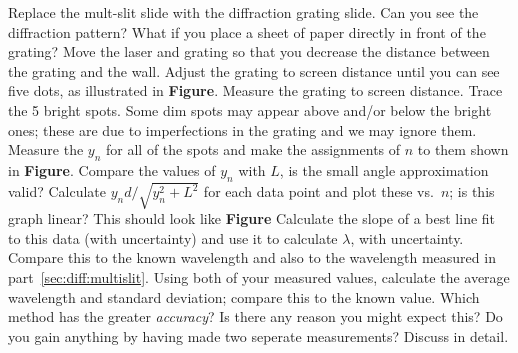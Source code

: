 Replace the mult-slit slide with the diffraction grating slide.  Can you see
the diffraction pattern?  What if you place a sheet of paper directly in front
of the grating?  Move the laser and grating so that you decrease the distance
between the grating and the wall. Adjust the grating to screen distance until 
you can see five dots, as illustrated in {\bf Figure}. 
%
%
Measure the grating to screen distance.  Trace the 5 bright spots. Some dim 
spots may appear above and/or below the bright ones; these are due to 
imperfections in the grating and we may ignore them. Measure the $y_n$ for all
of the spots and make the assignments of $n$ to them shown in {\bf Figure}.  
Compare the values of $y_n$ with $L$, is the small angle approximation valid?
Calculate $y_n d/\sqrt{y_n^2 + L^2}$ for each data point and plot these 
vs.~$n$; is this graph linear? This should look like {\bf Figure} 
% 
%
Calculate the slope of a best line fit to this data (with uncertainty) and use
it to calculate $\lambda$, with uncertainty.  Compare this to the known 
wavelength and also to the wavelength measured in 
part~\ref{sec:diff:multislit}. Using both of your measured values, calculate 
the average wavelength and standard deviation; compare this to the known 
value.  Which method has the greater {\it accuracy}? Is there any reason
you might expect this? Do you gain anything by having made two seperate 
measurements? Discuss in detail.  

